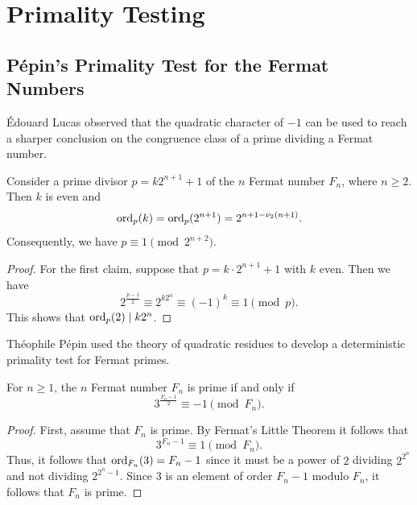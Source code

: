 \chapter{Primality Testing}

\section{P\'epin's Primality Test for the Fermat Numbers}

\'Edouard Lucas observed that the quadratic character of $-1$ can be used to reach a sharper conclusion on the congruence class of a prime dividing a Fermat number.

\begin{theorem}
  Consider a prime divisor $p=k2^{n+1}+1$ of the $n$\supth{} Fermat number $F_n$, where $n\geq 2$. Then $k$ is even and
  \begin{equation*}
    \operatorname{ord}_p(k)= \operatorname{ord}_p(2^{n+1})=2^{n+1-\nu_2(n+1)}.
  \end{equation*}
  Consequently, we have $p\equiv 1\pmod{2^{n+2}}$.
\end{theorem}

\begin{noteblock}
  \begin{proof}
    For the first claim, suppose that $p=k\cdot 2^{n+1}+1$ with $k$ even. Then we have
    \begin{equation*}
      2^{\frac{p-1}{2}}\equiv 2^{k2^{n}}\equiv (-1)^k\equiv 1\pmod{p}.
    \end{equation*}
    This shows that $\operatorname{ord}_{p}(2)\mid k2^n$.
  \end{proof}
\end{noteblock}  

Théophile Pépin used the theory of quadratic residues to develop a deterministic primality test for Fermat primes.

\begin{theorem}
  For $n\geq 1$, the $n$\supth{} Fermat number $F_n$ is prime if and only if
  \begin{equation*}
    3^{\frac{F_n-1}{2}}\equiv -1\pmod{F_n}.
  \end{equation*}
\end{theorem}

\begin{noteblock}
  \begin{proof}
    First, assume that $F_n$ is prime. By Fermat's Little Theorem it follows that
    \begin{equation*}
      3^{F_n-1}\equiv 1\pmod{F_n}.
    \end{equation*}
    Thus, it follows that $\operatorname{ord}_{F_n}(3)=F_n-1$ since it must be a power of $2$ dividing $2^{2^n}$ and not dividing $2^{2^n-1}$. Since $3$ is an element of order $F_n-1$ modulo $F_n$, it follows that $F_n$ is prime.
  \end{proof}
\end{noteblock}

